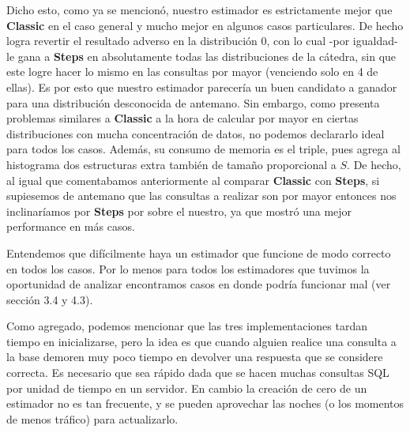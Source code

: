 Dicho esto, como ya se mencionó, nuestro estimador es estrictamente mejor que \textbf{Classic} en el caso general y mucho mejor en algunos casos particulares. De hecho logra revertir el resultado adverso en la distribución 0, con lo cual -por igualdad- le gana a \textbf{Steps} en absolutamente todas las distribuciones de la cátedra, sin que este logre hacer lo mismo en las consultas por mayor (venciendo solo en 4 de ellas). Es por esto que nuestro estimador parecería un buen candidato a ganador para una distribución desconocida de antemano. Sin embargo, como presenta problemas similares a \textbf{Classic} a la hora de calcular por mayor en ciertas distribuciones con mucha concentración de datos, no podemos declararlo ideal para todos los casos. Además, su consumo de memoria es el triple, pues agrega al histograma dos estructuras extra también de tamaño proporcional a $S$. De hecho, al igual que comentabamos anteriormente al comparar \textbf{Classic} con \textbf{Steps}, si supiesemos de antemano que las consultas a realizar son por mayor entonces nos inclinaríamos por \textbf{Steps} por sobre el nuestro, ya que mostró una mejor performance en más casos.

Entendemos que difícilmente haya un estimador que funcione de modo correcto en todos los casos. Por lo menos para todos los estimadores que tuvimos la oportunidad de analizar encontramos casos en donde podría funcionar mal (ver sección 3.4 y 4.3).

Como agregado, podemos mencionar que las tres implementaciones tardan tiempo en inicializarse, pero la idea es que cuando alguien realice una consulta a la base demoren muy poco tiempo en devolver una respuesta que se considere correcta. Es necesario que sea rápido dada que se hacen muchas consultas SQL por unidad de tiempo en un servidor. En cambio la creación de cero de un estimador no es tan frecuente, y se pueden aprovechar las noches (o los momentos de menos tráfico) para actualizarlo. 
